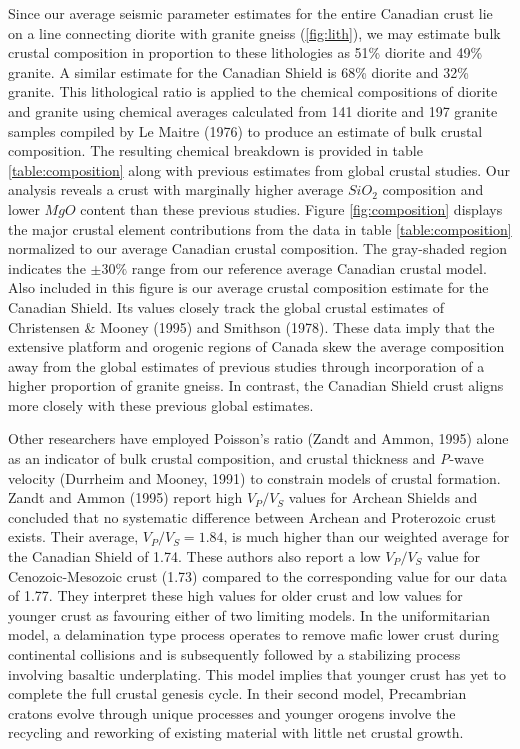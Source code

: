 \documentclass[review]{elsarticle}
\begin{document}
Since our average seismic parameter estimates for the entire Canadian crust lie on a line connecting diorite with granite gneiss (\ref{fig:lith}), we may estimate bulk crustal composition in proportion to these lithologies as 51\% diorite and 49\% granite. A similar estimate for the Canadian Shield is 68\% diorite and 32\% granite. This lithological ratio is applied to the chemical compositions of diorite and granite using chemical averages calculated from 141 diorite and 197 granite samples compiled by Le Maitre (1976) to produce an estimate of bulk crustal composition. The resulting chemical breakdown is provided in table \ref{table:composition} along with previous estimates from global crustal studies. Our analysis reveals a crust with marginally higher average $SiO_2$ composition and lower $MgO$ content than these previous studies. Figure \ref{fig:composition} displays the major crustal element contributions from the data in table \ref{table:composition} normalized to our average Canadian crustal composition. The gray-shaded region indicates the $\pm 30\%$ range from our reference average Canadian crustal model.  Also included in this figure is our average crustal composition estimate for the Canadian Shield. Its values closely track the global crustal estimates of Christensen \& Mooney (1995) and Smithson (1978). These data imply that the extensive platform and orogenic regions of Canada skew the average composition away from the global estimates of previous studies through incorporation of a higher proportion of granite gneiss. In contrast, the Canadian Shield crust aligns more closely with these previous global estimates.

Other researchers have employed Poisson's ratio (Zandt and Ammon, 1995) alone as an indicator of bulk crustal composition, and crustal thickness and {\it P}-wave velocity (Durrheim and Mooney, 1991) to constrain models of crustal formation. Zandt and Ammon (1995) report high $V_P/V_S$ values for Archean Shields and concluded that no systematic difference between Archean and Proterozoic crust exists. Their average, $V_P/V_S=1.84$, is much higher than our weighted average for the Canadian Shield of 1.74. These authors also report a low $V_P/V_S$ value for Cenozoic-Mesozoic crust (1.73) compared to the corresponding value for our data of 1.77. They interpret these high values for older crust and low values for younger crust as favouring either of two limiting models. In the uniformitarian model, a delamination type process operates to remove mafic lower crust during continental collisions and is subsequently followed by a stabilizing process involving basaltic underplating. This model implies that younger crust has yet to complete the full crustal genesis cycle. In their second model, Precambrian cratons evolve through unique processes and younger orogens involve the recycling and reworking of existing material with little net crustal growth.
\end{document}
